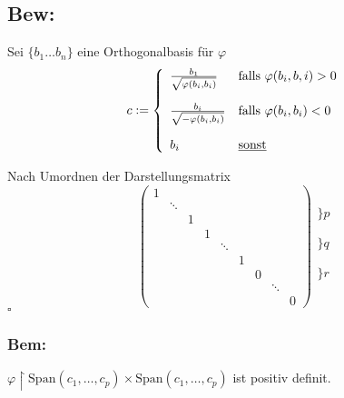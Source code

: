 \documentclass[titlepage,12pt,a4paper,ngerman]{report}
\newenvironment{bew}[1]{\subsection{Bew: #1}}{\hfill$\square$}
\newcommand{\Bew}[2]{\begin{bew}{#1}#2\end{bew}}
\newcommand{\tx}[1]{\textrm{#1}}
\begin{document}
\Bew{}{Sei $\{b_1 \dots b_n\}$ eine Orthogonalbasis für $\varphi$
	$$ c := \left \{ 
	\begin{array}{ll}
	\frac{b_1}{\sqrt{\varphi(b_i,b_i)}} & \tx{falls } \varphi(b_i,b,i) > 0\\[15pt]
	\frac{b_i}{\sqrt{-\varphi(b_i,b_i)}} & \tx{falls } \varphi(b_i,b_i) < 0\\[15pt]
	b_i & \tx{\underline{sonst}}
	\end{array}\right.$$
	
	Nach Umordnen der Darstellungsmatrix  
	$$\begin{pmatrix}
	1\\
	& \ddots\\
	& & 1\\
	& & &1\\
	& & & & \ddots\\
	& & & & & 1\\
	& & & & & & 0\\
	& & & & & & & \ddots\\
	& & & & & & & & 0
	\end{pmatrix} \begin{array}{ll}
	\\
	\bigg\} p\\
	\\
	\\
	\bigg\} q\\
	\\
	\\
	\bigg\} r\\
	\\
	\end{array}$$
}
\subsubsection{Bem:}
$ \varphi \upharpoonright \tx{Span}(c_1,\dots,c_p) \times \tx{Span}(c_1,\dots,c_p) $ ist positiv definit.
\end{document}

